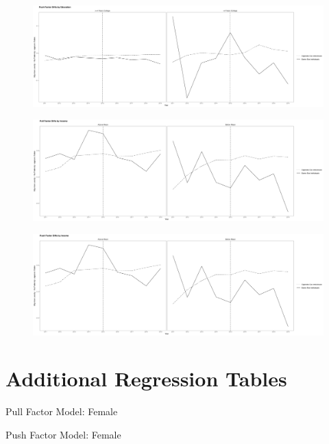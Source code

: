 \documentclass[12pt,letterpaper]{article}
\begin{document}
\begin{figure}[htbp]
    \centering
    \includegraphics[width=0.75\linewidth]{outputs/summary_stats/educ_ante_diffs.png}
    \caption{}
    \label{fig: fig:enter-label}
\end{figure}

\begin{figure}[htbp]
    \centering
    \includegraphics[width=0.75\linewidth]{outputs/summary_stats/inc_post_diffs.png}
    \caption{}
    \label{fig: fig:enter-label}
\end{figure}

\begin{figure}[htbp]
    \centering
    \includegraphics[width=0.75\linewidth]{outputs/summary_stats/inc_ante_diffs.png}
    \caption{}
    \label{fig: fig:enter-label}
\end{figure}

\floatBarrier
\section{Additional Regression Tables}
\begin{table}[htbp]
    \centering
    \caption{Pull Factor Model: Female}
    \label{tab: female_expost_model}
    
\end{table}
\begin{table}[htbp] %
    \centering
    \caption{Push Factor Model: Female}
    \label{tab: female_exante_model}
    
\end{table}
\end{document}
